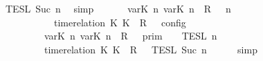 \begin{isabellebody}
\ \ \ \ \ \ \ \ {\isasyminter}\ {\isasymlbrakk}{\isasymlbrakk}\ {\isasymPhi}\ {\isasymrbrakk}{\isasymrbrakk}\isactrlsub T\isactrlsub E\isactrlsub S\isactrlsub L\isactrlbsup {\isasymge}\ Suc\ n\isactrlesup {\isacartoucheclose}\ \isamarkupfalse%
\ simp\isanewline
\ \ \isamarkupfalse%
\ \isamarkupfalse%
\ {\isacartoucheopen}{\isasymlbrakk}\ {\isacharparenleft}{\isacharparenleft}{\isasymlfloor}{\isasymtau}\isactrlsub v\isactrlsub a\isactrlsub r{\isacharparenleft}K\ n{\isacharparenright}{\isacharcomma}\ {\isasymtau}\isactrlsub v\isactrlsub a\isactrlsub r{\isacharparenleft}K\ n{\isacharparenright}{\isasymrfloor}\ {\isasymin}\ R{\isacharparenright}\ {\isacharhash}\ {\isasymGamma}{\isacharparenright}{\isacharcomma}\ n\isanewline
\ \ \ \ \ \ \ \ \ \ \ \ \ \ \ \ \ \ {\isasymturnstile}\ {\isasymPsi}\ {\isasymtriangleright}\ {\isacharparenleft}{\isacharparenleft}time{\isacharminus}relation\ {\isasymlfloor}K\ K\ {\isasymin}\ R{\isacharparenright}\ {\isacharhash}\ {\isasymPhi}{\isacharparenright}\ {\isasymrbrakk}\isactrlsub c\isactrlsub o\isactrlsub n\isactrlsub f\isactrlsub i\isactrlsub g\isanewline
\ \ \ \ \ \ \ \ \ \ \ \ \ \ \ \ \ {\isacharequal}\ {\isasymlbrakk}{\isasymlbrakk}\ {\isacharparenleft}{\isasymlfloor}{\isasymtau}\isactrlsub v\isactrlsub a\isactrlsub r{\isacharparenleft}K\ n{\isacharparenright}{\isacharcomma}\ {\isasymtau}\isactrlsub v\isactrlsub a\isactrlsub r{\isacharparenleft}K\ n{\isacharparenright}{\isasymrfloor}\ {\isasymin}\ R{\isacharparenright}\ {\isacharhash}\ {\isasymGamma}\ {\isasymrbrakk}{\isasymrbrakk}\isactrlsub p\isactrlsub r\isactrlsub i\isactrlsub m\ {\isasyminter}\ {\isasymlbrakk}{\isasymlbrakk}\ {\isasymPsi}\ {\isasymrbrakk}{\isasymrbrakk}\isactrlsub T\isactrlsub E\isactrlsub S\isactrlsub L\isactrlbsup {\isasymge}\ n\isactrlesup \isanewline
\ \ \ \ \ \ \ \ \ \ \ \ \ \ \ \ \ {\isasyminter}\ {\isasymlbrakk}{\isasymlbrakk}\ {\isacharparenleft}time{\isacharminus}relation\ {\isasymlfloor}K\ K\ {\isasymin}\ R{\isacharparenright}\ {\isacharhash}\ {\isasymPhi}\ {\isasymrbrakk}{\isasymrbrakk}\isactrlsub T\isactrlsub E\isactrlsub S\isactrlsub L\isactrlbsup {\isasymge}\ Suc\ n\isactrlesup {\isacartoucheclose}\isanewline
\ \ \ \ \isamarkupfalse%
\ simp\isanewline

\end{isabellebody}
